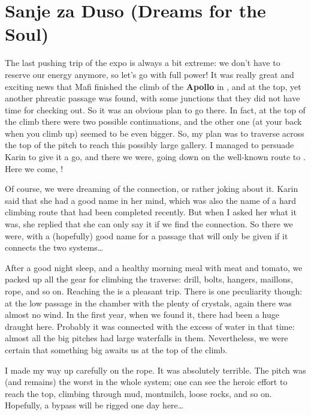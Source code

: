 \section{Sanje za Duso (Dreams for the Soul)}

The last pushing trip of the expo is always a bit extreme: we don't have
to reserve our energy anymore, so let's go with full power! It was
really great and exciting news that Mafi finished the climb of the
\textbf{Apollo} in , and at the top, yet
another phreatic passage was found, with some junctions that they did
not have time for checking out. So it was an obvious plan to go there.
In fact, at the top of the climb there were two possible continuations,
and the other one (at your back when you climb up) seemed to be even
bigger. So, my plan was to traverse across the top of the pitch to reach
this possibly large gallery. I managed to persuade Karin to give it a
go, and there we were, going down on the well-known route to
. Here we come, !

Of course, we were dreaming of the connection, or rather joking about
it. Karin said that she had a good name in her mind, which was also the
name of a hard climbing route that had been completed recently. But when
I asked her what it was, she replied that she can only say it if we find
the connection. So there we were, with a (hopefully) good name for a
passage that will only be given if it connects the two systems\ldots{}

After a good night sleep, and a healthy morning meal with meat and
tomato, we packed up all the gear for climbing the traverse: drill,
bolts, hangers, maillons, rope, and so on. Reaching the  is a pleasant trip. There is one peculiarity though: at the
low passage in the chamber with the plenty of crystals, again there was
almost no wind. In the first year, when we found it, there had been a
huge draught here. Probably it was connected with the excess of water in
that time: almost all the big pitches had large waterfalls in them.
Nevertheless, we were certain that something big awaits us at the top of
the  climb.

I made my way up carefully on the rope. It was absolutely terrible. The
pitch was (and remains) the worst in the whole system; one can see the
heroic effort to reach the top, climbing through mud, montmilch, loose
rocks, and so on. Hopefully, a bypass will be rigged one day
here\ldots{}

